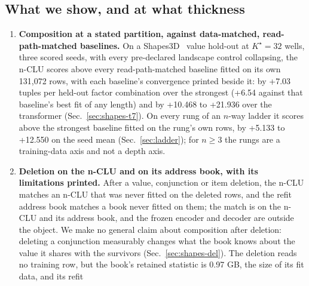 \documentclass{article} %
\newcommand{\Kstar}{\ensuremath{K^{\star}}}
\begin{document}
\subsection{What we show, and at what thickness}
\label{sec:contrib}

\begin{enumerate}[leftmargin=*,itemsep=2pt]
\item \textbf{Composition at a stated partition, against data-matched, read-path-matched baselines.} On a
  Shapes3D~\citep{burgess2018shapes,kim2018disentangling} value hold-out at $\Kstar=32$ wells, three scored seeds, with every %
  pre-declared landscape control collapsing, the n-CLU scores above every read-path-matched baseline
  fitted on its own 131,072 rows, with each baseline's convergence printed beside it: by +7.03 tuples %
  per held-out factor combination over the strongest (+6.54 against that baseline's best fit of any length) and by +10.468 %
  to +21.936 over the transformer (Sec.~\ref{sec:shapes-t7}). On every rung of an $n$-way ladder it %
  scores above the strongest baseline fitted on the rung's own rows, by +5.133 to +12.550 on the seed %
  mean (Sec.~\ref{sec:ladder}); for $n\ge3$ the rungs are a training-data axis and not a depth axis.
\item \textbf{Deletion on the n-CLU and on its address book, with its limitations printed.} After
  a value, conjunction or item deletion, the n-CLU matches an n-CLU that was never fitted on the deleted
  rows, and the refit address book matches a book never fitted on them; the match is on the n-CLU and
  its address book, and the frozen encoder and decoder are outside the object. We make no general claim
  about composition after deletion: deleting a conjunction measurably changes what the book knows %
  about the value it shares with the survivors (Sec.~\ref{sec:shapes-del}). The deletion reads no
  training row, but the book's retained statistic is 0.97 GB, the size of its fit data, and its refit %

\end{enumerate}
\end{document}
